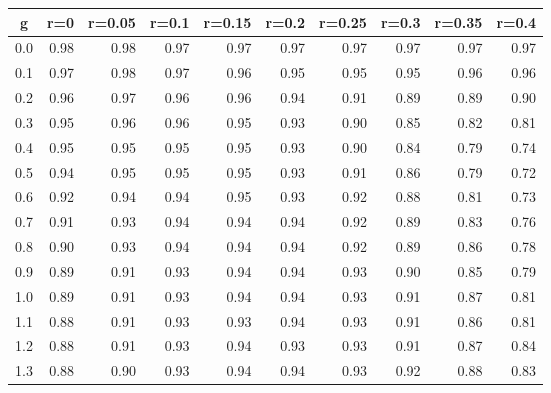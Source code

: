 %
\begin{table}[!tbp]
 \begin{center}
 \begin{tabular}{rrrrrrrrrr}\hline\hline
\multicolumn{1}{c}{g}&\multicolumn{1}{c}{r=0}&\multicolumn{1}{c}{r=0.05}&\multicolumn{1}{c}{r=0.1}&\multicolumn{1}{c}{r=0.15}&\multicolumn{1}{c}{r=0.2}&\multicolumn{1}{c}{r=0.25}&\multicolumn{1}{c}{r=0.3}&\multicolumn{1}{c}{r=0.35}&\multicolumn{1}{c}{r=0.4}\tabularnewline
\hline
0.0&0.98&0.98&0.97&0.97&0.97&0.97&0.97&0.97&0.97\tabularnewline
0.1&0.97&0.98&0.97&0.96&0.95&0.95&0.95&0.96&0.96\tabularnewline
0.2&0.96&0.97&0.96&0.96&0.94&0.91&0.89&0.89&0.90\tabularnewline
0.3&0.95&0.96&0.96&0.95&0.93&0.90&0.85&0.82&0.81\tabularnewline
0.4&0.95&0.95&0.95&0.95&0.93&0.90&0.84&0.79&0.74\tabularnewline
0.5&0.94&0.95&0.95&0.95&0.93&0.91&0.86&0.79&0.72\tabularnewline
0.6&0.92&0.94&0.94&0.95&0.93&0.92&0.88&0.81&0.73\tabularnewline
0.7&0.91&0.93&0.94&0.94&0.94&0.92&0.89&0.83&0.76\tabularnewline
0.8&0.90&0.93&0.94&0.94&0.94&0.92&0.89&0.86&0.78\tabularnewline
0.9&0.89&0.91&0.93&0.94&0.94&0.93&0.90&0.85&0.79\tabularnewline
1.0&0.89&0.91&0.93&0.94&0.94&0.93&0.91&0.87&0.81\tabularnewline
1.1&0.88&0.91&0.93&0.93&0.94&0.93&0.91&0.86&0.81\tabularnewline
1.2&0.88&0.91&0.93&0.94&0.93&0.93&0.91&0.87&0.84\tabularnewline
1.3&0.88&0.90&0.93&0.94&0.94&0.93&0.92&0.88&0.83\tabularnewline
\hline
\end{tabular}

\end{center}

\end{table}

